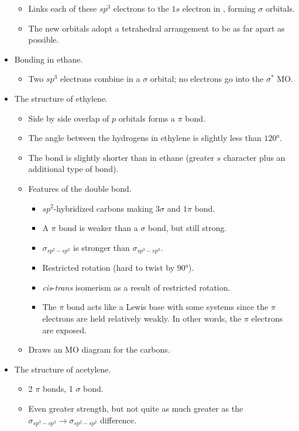 \documentclass[../notes.tex]{subfiles}
\begin{document}
\begin{itemize}
\begin{itemize}
        \item Links each of these $sp^3$ electrons to the $1s$ electron in , forming $\sigma$ orbitals.
        \item The new orbitals adopt a tetrahedral arrangement to be as far apart as possible.
    \end{itemize}
    \item Bonding in ethane.
    \begin{itemize}
        \item Two $sp^3$ electrons combine in a $\sigma$ orbital; no electrons go into the $\sigma^*$ MO.
    \end{itemize}
    \item The structure of ethylene.
    \begin{itemize}
        \item Side by side overlap of $p$ orbitals forms a $\pi$ bond.
        \item The angle between the hydrogens in ethylene is slightly less than $\ang{120}$.
        \item The bond is slightly shorter than in ethane (greater $s$ character plus an additional type of bond).
        \item Features of the  double bond.
        \begin{itemize}
            \item $sp^2$-hybridized carbons making $3\sigma$ and $1\pi$ bond.
            \item A $\pi$ bond is weaker than a $\sigma$ bond, but still strong.
            \item $\sigma_{sp^2-sp^2}$ is stronger than $\sigma_{sp^3-sp^3}$.
            \item Restricted rotation (hard to twist  by $\ang{90}$).
            \item \emph{cis}-\emph{trans} isomerism as a result of restricted rotation.
            \item The $\pi$ bond acts like a Lewis base with some systems since the $\pi$ electrons are held relatively weakly. In other words, the $\pi$ electrons are exposed.
        \end{itemize}
        \item Draws an MO diagram for the carbons.
    \end{itemize}
    \item The structure of acetylene.
    \begin{itemize}
        \item 2 $\pi$ bonds, 1 $\sigma$ bond.
        \item Even greater strength, but not quite as much greater as the $\sigma_{sp^3-sp^3}\to\sigma_{sp^2-sp^2}$ difference.
    \end{itemize}
\end{itemize}
\end{document}

